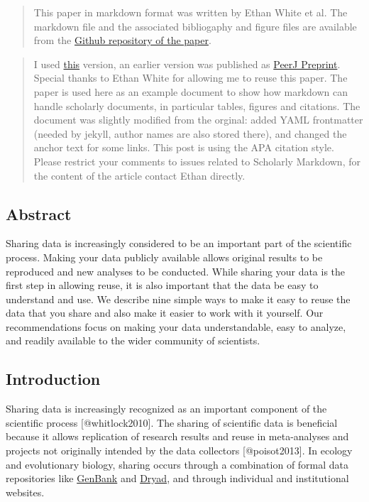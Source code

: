 \begin{quote}
This paper in markdown format was written by Ethan White et al. The
markdown file and the associated bibliogaphy and figure files are
available from the
\href{https://github.com/weecology/data-sharing-paper}{Github repository
of the paper}.
\end{quote}

\begin{quote}
I used
\href{https://github.com/weecology/data-sharing-paper/commit/b5a73eb0942a18bb29810025a528aea48a8465e7}{this}
version, an earlier version was published as
\href{http://dx.doi.org/10.7287/peerj.preprints.7v1}{PeerJ Preprint}.
Special thanks to Ethan White for allowing me to reuse this paper. The
paper is used here as an example document to show how markdown can
handle scholarly documents, in particular tables, figures and citations.
The document was slightly modified from the orginal: added YAML
frontmatter (needed by jekyll, author names are also stored there), and
changed the anchor text for some links. This post is using the APA
citation style. Please restrict your comments to issues related to
Scholarly Markdown, for the content of the article contact Ethan
directly.
\end{quote}

\subsection{Abstract}\label{abstract}

Sharing data is increasingly considered to be an important part of the
scientific process. Making your data publicly available allows original
results to be reproduced and new analyses to be conducted. While sharing
your data is the first step in allowing reuse, it is also important that
the data be easy to understand and use. We describe nine simple ways to
make it easy to reuse the data that you share and also make it easier to
work with it yourself. Our recommendations focus on making your data
understandable, easy to analyze, and readily available to the wider
community of scientists.

\subsection{Introduction}\label{introduction}

Sharing data is increasingly recognized as an important component of the
scientific process {[}@whitlock2010{]}. The sharing of scientific data
is beneficial because it allows replication of research results and
reuse in meta-analyses and projects not originally intended by the data
collectors {[}@poisot2013{]}. In ecology and evolutionary biology,
sharing occurs through a combination of formal data repositories like
\href{http://www.ncbi.nlm.nih.gov/genbank/}{GenBank} and
\href{http://datadryad.org/}{Dryad}, and through individual and
institutional websites.

